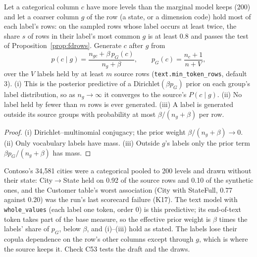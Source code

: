 \begin{proposition}\label{prop:nestedlabels}
Let a categorical column $c$ have more levels than the marginal model keeps (200) and let a coarser column $g$ of the row (a state, or a dimension code) hold most of each label's rows: on the sampled rows whose label occurs at least twice, the share $s$ of rows in their label's most common $g$ is at least 0.8 and passes the test of Proposition~\ref{prop:fdrows}. Generate $c$ after $g$ from
\[p(c\mid g)=\frac{n_{gc}+\beta\,p_G(c)}{n_g+\beta},\qquad p_G(c)=\frac{n_c+1}{n+V},\]
over the $V$ labels held by at least $m$ source rows (\texttt{text.min\_token\_rows}, default 3). (i) This is the posterior predictive of a Dirichlet$(\beta p_G)$ prior on each group's label distribution, so as $n_g\to\infty$ it converges to the source's $P(c\mid g)$. (ii) No label held by fewer than $m$ rows is ever generated. (iii) A label is generated outside its source groups with probability at most $\beta/(n_g+\beta)$ per row.
\end{proposition}
\begin{proof}
(i) Dirichlet--multinomial conjugacy; the prior weight $\beta/(n_g+\beta)\to0$. (ii) Only vocabulary labels have mass. (iii) Outside $g$'s labels only the prior term $\beta p_G/(n_g+\beta)$ has mass.
\end{proof}
\noindent Contoso's 34{,}581 cities were a categorical pooled to 200 levels and drawn without their state: City$\to$State held on 0.92 of the source rows and 0.10 of the synthetic ones, and the Customer table's worst association (City with StateFull, 0.77 against 0.20) was the run's last scorecard failure (K17). The text model with \texttt{whole\_values} (each label one token, order 0) is this predictive; its end-of-text token takes part of the base measure, so the effective prior weight is $\beta$ times the labels' share of $p_G$, below $\beta$, and (i)--(iii) hold as stated. The labels lose their copula dependence on the row's other columns except through $g$, which is where the source keeps it. Check C53 tests the draft and the draws.

